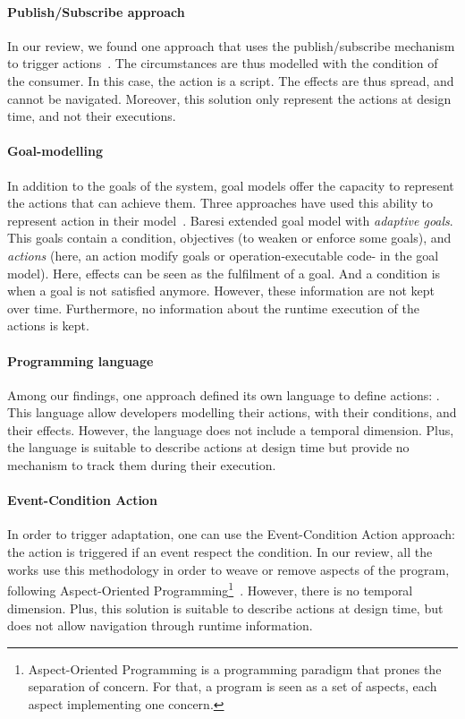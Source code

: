 \paragraph{Publish/Subscribe approach}
In our review, we found one approach that uses the publish/subscribe mechanism to trigger \glspl{action}~\cite{DBLP:conf/icse/BarbosaLMJ17}.
The \glspl{circumstance} are thus modelled with the condition of the consumer.
In this case, the action is a script.
The effects are thus spread, and cannot be navigated.
Moreover, this solution only represent the actions at design time, and not their executions.
	
\paragraph{Goal-modelling}
In addition to the goals of the system, goal models offer the capacity to represent the \glspl{action} that can achieve them.
Three approaches have used this ability to represent action in their model~\cite{DBLP:conf/icse/MendoncaAR14, DBLP:conf/iceccs/BencomoWSW12, DBLP:conf/re/BaresiPS10}.
Baresi \etal extended goal model with \textit{adaptive goals}.
This goals contain a condition, objectives (to weaken or enforce some goals), and \textit{actions} (here, an action modify goals or operation-executable code- in the goal model).
Here, effects can be seen as the fulfilment of a goal.
And a condition is when a goal is not satisfied anymore.
However, these information are not kept over time.
Furthermore, no information about the runtime execution of the actions is kept.
	
\paragraph{Programming language}
Among our findings, one approach defined its own language to define actions: \cite{DBLP:journals/jss/ChengG12}.
This language allow developers modelling their actions, with their conditions, and their effects.
However, the language does not include a temporal dimension.
Plus, the language is suitable to describe actions at design time but provide no mechanism to track them during their execution.
	
\paragraph{Event-Condition Action}
In order to trigger adaptation, one can use the Event-Condition Action approach: the action is triggered if an event respect the condition.
In our review, all the works use this methodology in order to weave or remove aspects of the program, following Aspect-Oriented Programming\footnote{Aspect-Oriented Programming is a programming paradigm that prones the separation of concern. For that, a program is seen as a set of aspects, each aspect implementing one concern.}~\cite{DBLP:conf/icws/CharfiDM09, DBLP:journals/scp/ParraBCD11, DBLP:conf/soco/DavidL06}.
However, there is no temporal dimension.
Plus, this solution is suitable to describe actions at design time, but does not allow navigation through runtime information.

